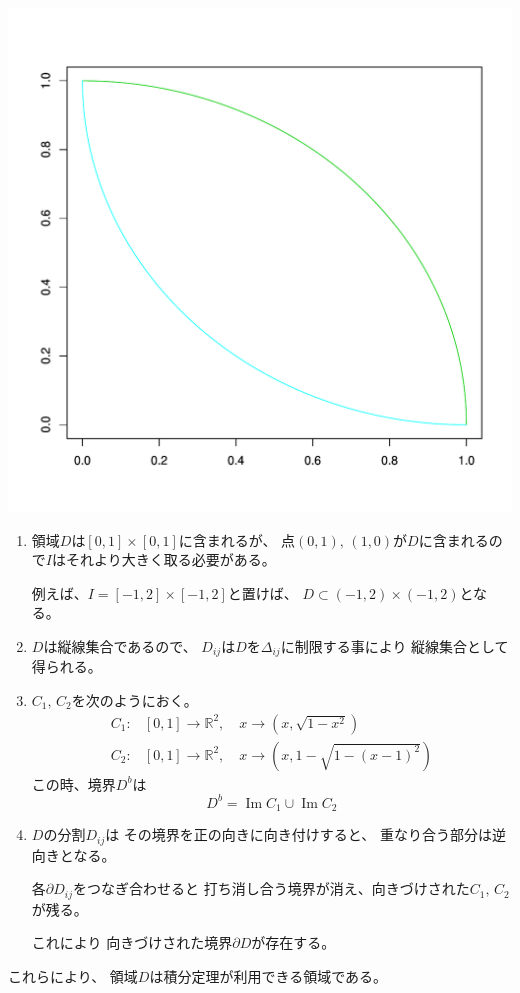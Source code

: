 \documentclass[12pt,b5paper]{ltjsarticle}
\newcommand{\Img}{\mathop{\mathrm{Im}}\nolimits}
\begin{document}
\begin{center}
 \includegraphics[scale=0.5]{dom.pdf}
\end{center}


\begin{enumerate}
 \item
      領域$D$は$[0,1]\times[0,1]$に含まれるが、
      点$(0,1),\,(1,0)$が$D$に含まれるので$I$はそれより大きく取る必要がある。

      例えば、$I=[-1,2]\times [-1,2]$と置けば、
      $D \subset (-1,2)\times (-1,2)$となる。

 \item
      $D$は縦線集合であるので、
      $D_{ij}$は$D$を$\Delta_{ij}$に制限する事により
      縦線集合として得られる。

 \item
      $C_1,\,C_2$を次のようにおく。
      \begin{align}
       C_1:& [0,1] \rightarrow \mathbb{R}^2, \quad x \to (x, \sqrt{1-x^2})\\
       C_2:& [0,1] \rightarrow \mathbb{R}^2, \quad x \to (x, 1-\sqrt{1-(x-1)^2})
      \end{align}
      この時、境界$D^b$は
      \begin{equation}
       D^b = \Img C_1 \cup \Img C_2
      \end{equation}

 \item
      $D$の分割$D_{ij}$は
      その境界を正の向きに向き付けすると、
      重なり合う部分は逆向きとなる。

      各$\partial D_{ij}$をつなぎ合わせると
      打ち消し合う境界が消え、向きづけされた$C_1,\,C_2$が残る。

      これにより
      向きづけされた境界$\partial D$が存在する。
\end{enumerate}

これらにより、
領域$D$は積分定理が利用できる領域である。

\hrulefill
\end{document}
